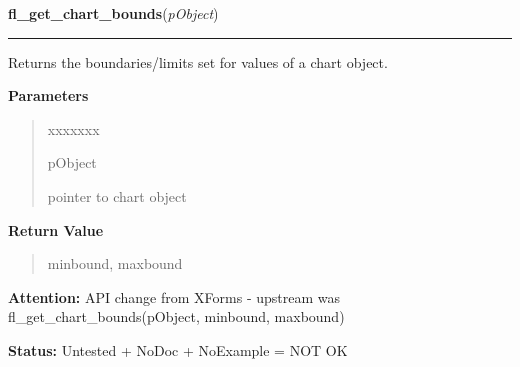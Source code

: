 \hspace{.8\funcindent}\begin{boxedminipage}{\funcwidth}

    \raggedright \textbf{fl\_get\_chart\_bounds}(\textit{pObject})

    \vspace{-1.5ex}

    \rule{\textwidth}{0.5\fboxrule}
\setlength{\parskip}{2ex}
    Returns the boundaries/limits set for values of a chart object.

\setlength{\parskip}{1ex}
      \textbf{Parameters}
      \vspace{-1ex}

      \begin{quote}
        \begin{Ventry}{xxxxxxx}

          \item[pObject]

          pointer to chart object

        \end{Ventry}

      \end{quote}

      \textbf{Return Value}
    \vspace{-1ex}

      \begin{quote}
      minbound, maxbound

      \end{quote}

\textbf{Attention:} API change from XForms - upstream was fl\_get\_chart\_bounds(pObject, 
minbound, maxbound)



\textbf{Status:} Untested + NoDoc + NoExample = NOT OK



    \end{boxedminipage}

    \label{xformslib:library:fl_set_chart_maxnumb}

    \vspace{0.5ex}


